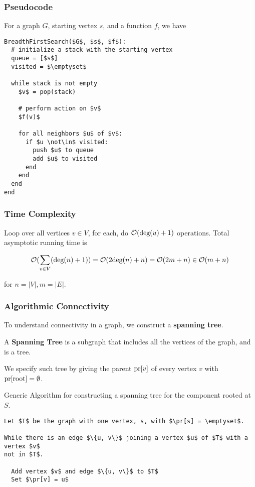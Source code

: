 \documentclass[12pt]{article}
\begin{document}
  \subsubsection{Pseudocode}

  For a graph $G$, starting vertex $s$, and a function $f$, we have

  \begin{lstlisting}[]
BreadthFirstSearch($G$, $s$, $f$):
  # initialize a stack with the starting vertex
  queue = [$s$]
  visited = $\emptyset$

  while stack is not empty
    $v$ = pop(stack)

    # perform action on $v$
    $f(v)$

    for all neighbors $u$ of $v$:
      if $u \not\in$ visited:
        push $u$ to queue
        add $u$ to visited
      end
    end
  end
end
  \end{lstlisting}

  \subsubsection{Time Complexity}

  Loop over all vertices $v \in V$, for each, do $\mathcal O(\text{deg}(u) + 1)$ operations.
  Total asymptotic running time is

  \[
    \mathcal O(\sum_{v \in V} (\text{deg}(n) + 1)) = \mathcal O(2\text{deg}(n) + n) = \mathcal O(2m + n) \in \mathcal O(m + n)
  \]

  for $n = |V|, m = |E|$.

  \subsubsection{Algorithmic Connectivity}

  To understand connectivity in a graph, we construct a {\bf spanning tree}.

   {
    A {\bf Spanning Tree} is a subgraph that includes all the vertices of the
    graph, and is a tree.
  }

  We specify such tree by giving the parent $\text{pr}[v]$ of every vertex $v$
  with $\text{pr}[\text{root}] = \emptyset$.

  Generic Algorithm for constructing a spanning tree for the component rooted at
  $S$.

  \begin{lstlisting}[]
Let $T$ be the graph with one vertex, s, with $\pr[s] = \emptyset$.

While there is an edge $\{u, v\}$ joining a vertex $u$ of $T$ with a vertex $v$
not in $T$.

  Add vertex $v$ and edge $\{u, v\}$ to $T$
  Set $\pr[v] = u$
  \end{lstlisting}
\end{document}
